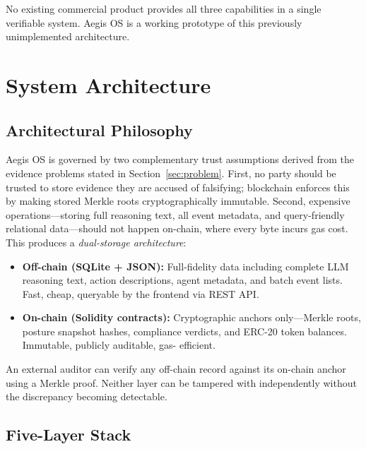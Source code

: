 \documentclass[12pt,a4paper]{article}
\begin{document}
No existing commercial product provides all three capabilities in a
single verifiable system. Aegis OS is a working prototype of this
previously unimplemented architecture.


\section{System Architecture}
\label{sec:architecture}

\subsection{Architectural Philosophy}
\label{sec:arch-philosophy}

Aegis OS is governed by two complementary trust assumptions derived from
the evidence problems stated in Section~\ref{sec:problem}.
First, no party should be trusted to store evidence they are accused of
falsifying; blockchain enforces this by making stored Merkle roots
cryptographically immutable. Second, expensive operations---storing full
reasoning text, all event metadata, and query-friendly relational
data---should not happen on-chain, where every byte incurs gas cost.
This produces a \emph{dual-storage architecture}:

\begin{itemize}
  \item \textbf{Off-chain (SQLite + JSON):} Full-fidelity data including
        complete LLM reasoning text, action descriptions, agent metadata,
        and batch event lists. Fast, cheap, queryable by the frontend via
        REST API.
  \item \textbf{On-chain (Solidity contracts):} Cryptographic anchors
        only---Merkle roots, posture snapshot hashes, compliance verdicts,
        and ERC-20 token balances. Immutable, publicly auditable, gas-
        efficient.
\end{itemize}

An external auditor can verify any off-chain record against its on-chain
anchor using a Merkle proof. Neither layer can be tampered with
independently without the discrepancy becoming detectable.

\subsection{Five-Layer Stack}
\label{sec:layers}
\end{document}

